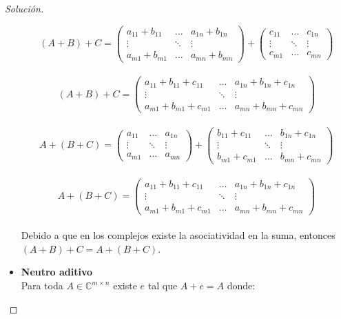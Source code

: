 \documentclass[12pt]{book}
\newcommand{\C}{\mathbb{C}}
\newenvironment{solucion}
  {\renewcommand\qedsymbol{$\square$}\begin{proof}[Solución]}
  {\end{proof}}
\begin{document}
\begin{solucion}
\begin{itemize}
        \[(A + B) + C =\begin{pmatrix}
        a_{11}+b_{11}  & \dots & a_{1n}+b_{1n}\\
        \vdots & \ddots & \vdots\\
        a_{m1}+b_{m1} & \dots & a_{mn}+b_{mn}
        \end{pmatrix}
        +
        \begin{pmatrix}
        c_{11} & \dots & c_{1n}\\
        \vdots & \ddots & \vdots\\
        c_{m1} & \dots & c_{mn}
        \end{pmatrix}
        \]\\
        \[(A + B) + C =
        \begin{pmatrix}
        a_{11}+b_{11}+c_{11}  & \dots & a_{1n}+b_{1n}+c_{1n}\\
        \vdots & \ddots & \vdots\\
        a_{m1}+b_{m1}+c_{m1} & \dots & a_{mn}+b_{mn}+c_{mn}
        \end{pmatrix}\]\\
        \[A + (B + C) =\begin{pmatrix}
        a_{11} & \dots & a_{1n}\\
        \vdots & \ddots & \vdots\\
        a_{m1} & \dots & a_{mn}
        \end{pmatrix}
        +
        \begin{pmatrix}
        b_{11}+c_{11} & \dots & b_{1n}+c_{1n}\\
        \vdots & \ddots & \vdots\\
        b_{m1}+c_{m1} & \dots & b_{mn}+c_{mn}
        \end{pmatrix}\]\\
        \[A + (B + C)=
        \begin{pmatrix}
        a_{11}+b_{11}+c_{11}  & \dots & a_{1n}+b_{1n}+c_{1n}\\
        \vdots & \ddots & \vdots\\
        a_{m1}+b_{m1}+c_{m1} & \dots & a_{mn}+b_{mn}+c_{mn}
        \end{pmatrix}\]\\
        Debido a que en los complejos existe la asociatividad en la suma, entonces $(A + B) + C=A + (B + C)$.\\
    \item \textbf{Neutro aditivo}\\
        Para toda $A \in \C^{m\times n}$ existe $e$ tal que $A + e = A$ donde:\\

\end{itemize}
\end{solucion}
\end{document}
